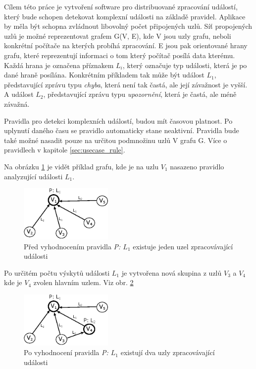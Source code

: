 \documentclass[
  digital, %
  table,   %
  nolof,     %
  nolot,     %
  oneside, %
  nocover,
  monochrome,
  12pt
]{fithesis3}
\begin{document}
Cílem této práce je vytvoření software pro distribuované zpracování událostí, který bude schopen detekovat komplexní události na základě pravidel. Aplikace by měla být schopna zvládnout libovolný počet připojených uzlů. Síť propojených uzlů je možné reprezentovat grafem G(V, E), kde V jsou uzly grafu, neboli konkrétní počítače na kterých probíhá zpracování. E jsou pak orientované hrany grafu, které reprezentují informaci o tom který počítač posílá data kterému. Každá hrana je označena příznakem \textit{$L_i$}, který označuje typ události, která je po dané hraně posílána. Konkrétním příkladem tak může být událost \textit{$L_1$}, představující zprávu typu \textit{chyba}, která není tak častá, ale její závažnost je vyšší. A událost \textit{$L_2$}, představující zprávu typu \textit{upozornění}, která je častá, ale méně závažná.

Pravidla pro detekci komplexních událostí, budou mít časovou platnost. Po uplynutí daného času se pravidlo automaticky stane neaktivní. Pravidla bude také možné nasadit pouze na určitou podmnožinu uzlů V grafu G. Více o pravidlech v kapitole \ref{sec:usecase_rule}.

Na obrázku \ref{fig:analysis_case_1} je vidět příklad grafu, kde je na uzlu \textit{$V_1$} nasazeno pravidlo analyzující události \textit{$L_1$}.

\begin{figure}[H]
	\centering
    \includegraphics[width=0.4\textwidth, height=0.15\textheight]{images/analysis_case_1.eps}
    \caption{Před vyhodnocením pravidla \textit{P: $L_1$} existuje jeden uzel zpracovávající události}
    \label{fig:analysis_case_1}
\end{figure}

Po určitém počtu výskytů události \textit{$L_1$} je vytvořena nová skupina z uzlů \textit{$V_3$} a \textit{$V_4$} kde je \textit{$V_4$} zvolen hlavním uzlem. Viz obr. \ref{fig:analysis_case_2}

\begin{figure}[H]
	\centering
    \includegraphics[width=0.4\textwidth, height=0.15\textheight]{images/analysis_case_2.eps}
    \caption{Po vyhodnocení pravidla \textit{P: $L_1$} existují dva uzly zpracovávající události}
    \label{fig:analysis_case_2}
\end{figure}
\end{document}
